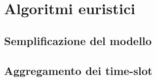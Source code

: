 \chapter{Algoritmi euristici}
\label{cap:algoritmi-euristici}

%
%
\section{Semplificazione del modello}
\label{sec:semplificazione-modello}

%
%
\section{Aggregamento dei time-slot}
\label{sec:aggregamento-time-slot}
